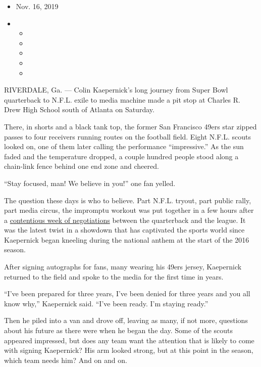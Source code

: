 \begin{itemize}
\item
  Nov. 16, 2019
\item
  \begin{itemize}
  \item
  \item
  \item
  \item
  \item
  \end{itemize}
\end{itemize}

RIVERDALE, Ga. --- Colin Kaepernick's long journey from Super Bowl
quarterback to N.F.L. exile to media machine made a pit stop at Charles
R. Drew High School south of Atlanta on Saturday.

There, in shorts and a black tank top, the former San Francisco 49ers
star zipped passes to four receivers running routes on the football
field. Eight N.F.L. scouts looked on, one of them later calling the
performance ``impressive.'' As the sun faded and the temperature
dropped, a couple hundred people stood along a chain-link fence behind
one end zone and cheered.

``Stay focused, man! We believe in you!'' one fan yelled.

The question these days is who to believe. Part N.F.L. tryout, part
public rally, part media circus, the impromptu workout was put together
in a few hours after a
\href{https://www.nytimes3xbfgragh.onion/2019/11/13/sports/football/colin-kaepernick-workout.html}{contentious
week of negotiations} between the quarterback and the league. It was the
latest twist in a showdown that has captivated the sports world since
Kaepernick began kneeling during the national anthem at the start of the
2016 season.

After signing autographs for fans, many wearing his 49ers jersey,
Kaepernick returned to the field and spoke to the media for the first
time in years.

``I've been prepared for three years, I've been denied for three years
and you all know why,'' Kaepernick said. ``I've been ready. I'm staying
ready.''

Then he piled into a van and drove off, leaving as many, if not more,
questions about his future as there were when he began the day. Some of
the scouts appeared impressed, but does any team want the attention that
is likely to come with signing Kaepernick? His arm looked strong, but at
this point in the season, which team needs him? And on and on.

